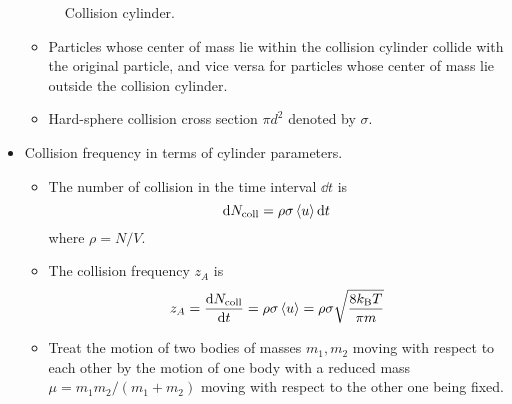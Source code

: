 \documentclass[../notes.tex]{subfiles}
\begin{document}
\begin{itemize}
\begin{figure}[h!]
        \caption{Collision cylinder.}
        \label{fig:collisionCylinder}
    \end{figure}
    \begin{itemize}
        \item Particles whose center of mass lie within the collision cylinder collide with the original particle, and vice versa for particles whose center of mass lie outside the collision cylinder.
        \item Hard-sphere collision cross section $\pi d^2$ denoted by $\sigma$.
    \end{itemize}
    \item Collision frequency in terms of cylinder parameters.
    \begin{itemize}
        \item The number of collision in the time interval $\dd{t}$ is
        \begin{equation*}
            \dd{N_\text{coll}} = \rho\sigma\left\langle{u}\right\rangle\dd{t}
        \end{equation*}
        where $\rho=N/V$.
        \item The collision frequency $z_A$ is
        \begin{equation*}
            z_A = \dv{N_\text{coll}}{t}
            = \rho\sigma\left\langle{u}\right\rangle
            = \rho\sigma\sqrt{\frac{8k_\text{B} T}{\pi m}}
        \end{equation*}
        \item Treat the motion of two bodies of masses $m_1,m_2$ moving with respect to each other by the motion of one body with a reduced mass $\mu=m_1m_2/(m_1+m_2)$ moving with respect to the other one being fixed.

\end{itemize}
\end{itemize}
\end{document}
